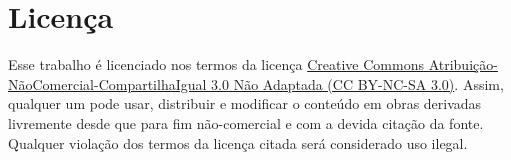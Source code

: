 \chapter*{Licença}

Esse trabalho é licenciado nos termos da licença \href{http://creativecommons.org/licenses/by-nc-sa/3.0/deed.pt}{Creative Commons Atribuição-NãoComercial-CompartilhaIgual 3.0 Não Adaptada (CC BY-NC-SA 3.0)}.
Assim, qualquer um pode usar, distribuir e modificar o conteúdo em obras derivadas livremente desde que para fim não-comercial e com a devida citação da fonte.
Qualquer violação dos termos da licença citada será considerado uso ilegal.
